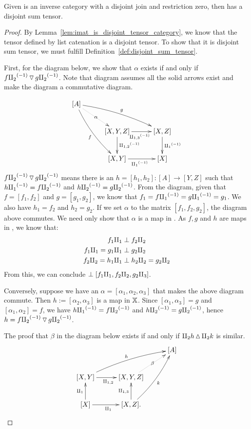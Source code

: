 \begin{lemma}\label{lem:imat_tensor_is_a_disjoint_sum_tensor}
  Given \X is an inverse category with a disjoint join and restriction zero, then \imatx
  has a disjoint sum tensor.
\end{lemma}
\begin{proof}
  By Lemma~\ref{lem:imat_is_disjoint_tensor_category}, we know that the tensor defined by
  list catenation is a disjoint tensor. To show that it is disjoint sum tensor, we must
  fulfill Definition~\ref{def:disjoint_sum_tensor}.

  First, for the diagram below, we show that $\alpha$ exists if and only if
  $f{\amalg_{2}}^{(-1)} \operatorname{\triangledown} g{\amalg_{2}}^{(-1)}$. Note that diagram assumes all the solid arrows exist and make the
  diagram a commutative diagram.

  \begin{align*}
    \xymatrix@C+5pt{
      [A] \ar@/_/[ddr]_f \ar@/^/[drr]^g \ar@{.>}[dr]|-{\alpha} \\
        & [X,Y,Z] \ar[d]^{\icp{1,2}} \ar[r]_{\icp{1,3}} & [X,Z] \ar[d]^{\icpa} \\
        & [X,Y] \ar[r]_{\icpa} & [X]
    }
  \end{align*}
  $f{\amalg_{2}}^{(-1)} \operatorname{\triangledown} g{\amalg_{2}}^{(-1)}$ means there is an $h = [h_1,h_2]: [A]\to[Y,Z]$ such that
  $h{\amalg_{1}}^{(-1)} = f{\amalg_{2}}^{(-1)}$ and $h{\amalg_{2}}^{(-1)} = g{\amalg_{2}}^{(-1)}$. From the diagram, given that $f = [f_1,f_2]$ and
  $g = [g_1,g_2]$, we know that $f_1 = f{\amalg_{1}}^{(-1)} = g{\amalg_{1}}^{(-1)} = g_1$. We also have $h_1 = f_2$ and
  $h_2 = g_2$. If we set $\alpha$ to the matrix $[f_1,f_2,g_2]$, the diagram above commutes.
  We need only show that $\alpha$ is a map in \imatx. As $f, g$ and $h$ are maps in
  \imatx, we know that:
  \begin{align*}
    f_1\amalg_{1} & \perp f_2 \amalg_{2}\\
    f_1\amalg_{1} = g_1\amalg_{1} & \perp g_2 \amalg_{2}\\
    f_2 \amalg_{2} = h_1\amalg_{1} & \perp h_2 \amalg_{2} = g_2 \amalg_{2}\\
  \end{align*}
  From this, we can conclude $\perp [f_1 \amalg_{1}, f_2 \amalg_{2}, g_2 \amalg_{3}]$.

  Conversely, suppose we have an $\alpha = [\alpha_1, \alpha_2, \alpha_3]$ that makes the
  above diagram commute. Then  $h := [\alpha_2, \alpha_3]$ is a map in $\mathbb{X}$.
  Since $[\alpha_1,\alpha_3] = g$ and $[\alpha_1,\alpha_2] = f$, we have
  $h{\amalg_{1}}^{(-1)} = f{\amalg_{2}}^{(-1)}$ and $h{\amalg_{2}}^{(-1)} = g{\amalg_{2}}^{(-1)}$, hence $h = f{\amalg_{2}}^{(-1)} \operatorname{\triangledown} g{\amalg_{2}}^{(-1)}$.

  The proof that $\beta$ in the diagram below exists if and only if $\amalg_{2}h\operatorname{\vartriangle} \amalg_{2}k$
  is similar.
  \[
    \xymatrix@C+5pt{
        &&[A] \\
         [X,Y] \ar[r]_{\cp{1,2}} \ar@/^/[urr]^h &[X,Y,Z] \ar@{.>}[ur]|-{\beta} \\
         [X] \ar[u]^{\cpa} \ar[r]_{\cpa} & [X,Z]. \ar[u]^{\cp{1,3}} \ar@/_/[uur]_k
    }
  \]
\end{proof}

